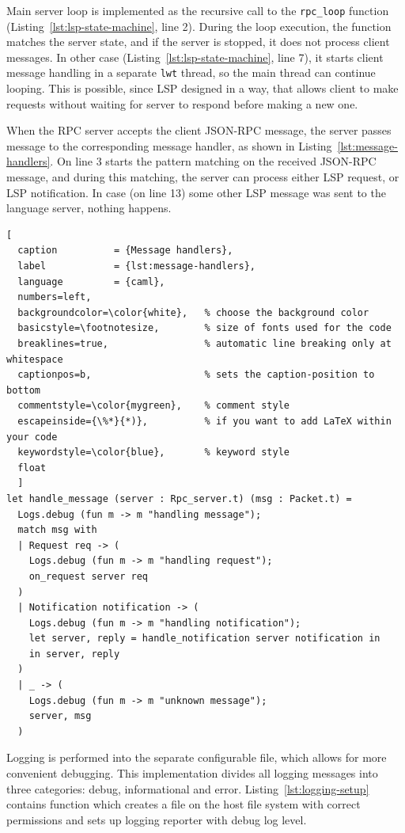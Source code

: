 Main server loop is implemented as the recursive call to the \texttt{rpc\_loop}
function (Listing~\ref{lst:lsp-state-machine}, line 2). During the loop
execution, the function matches the server state, and if the server is stopped,
it does not process client messages.  In other case
(Listing~\ref{lst:lsp-state-machine}, line 7), it starts client message handling
in a separate \texttt{lwt} thread, so the main thread can continue looping. This
is possible, since LSP designed in a way, that allows client to make requests
without waiting for server to respond before making a new one.

When the RPC server accepts the client JSON-RPC message, the server passes message to the
corresponding message handler, as shown in Listing~\ref{lst:message-handlers}. 
On line $3$ starts the pattern matching on the received JSON-RPC message, and during this 
matching, the server can process either LSP request, or LSP notification. In case (on line 13) 
some other LSP message was sent to the language server, nothing happens.

\begin{lstlisting}[
  caption          = {Message handlers}, 
  label            = {lst:message-handlers},
  language         = {caml},
  numbers=left,
  backgroundcolor=\color{white},   % choose the background color
  basicstyle=\footnotesize,        % size of fonts used for the code
  breaklines=true,                 % automatic line breaking only at whitespace
  captionpos=b,                    % sets the caption-position to bottom
  commentstyle=\color{mygreen},    % comment style
  escapeinside={\%*}{*)},          % if you want to add LaTeX within your code
  keywordstyle=\color{blue},       % keyword style
  float
  ]
let handle_message (server : Rpc_server.t) (msg : Packet.t) =
  Logs.debug (fun m -> m "handling message");
  match msg with 
  | Request req -> (
    Logs.debug (fun m -> m "handling request");
    on_request server req
  )
  | Notification notification -> (
    Logs.debug (fun m -> m "handling notification");
    let server, reply = handle_notification server notification in
    in server, reply
  )
  | _ -> (
    Logs.debug (fun m -> m "unknown message"); 
    server, msg
  )
\end{lstlisting}

Logging is performed into the separate configurable file, which allows for more 
convenient debugging. This implementation divides all logging messages into three
categories: debug, informational and error. Listing~\ref{lst:logging-setup} contains 
function which creates a file on the host file system with correct permissions and 
sets up logging reporter with debug log level.

